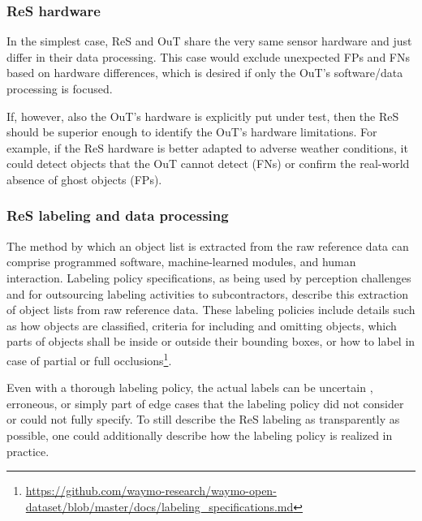 \documentclass[conference]{IEEEtran}
\begin{document}
\subsubsection{ReS hardware}
\label{sec:basic_ref_hw}

In the simplest case, ReS and OuT share the very same sensor hardware and just differ in their data processing. 
This case would exclude unexpected FPs and FNs based on hardware differences, which is desired if only the OuT's software/data processing is focused. 

If, however, also the OuT's hardware is explicitly put under test, then the ReS should be superior enough to identify the OuT's hardware limitations. 
For example, if the ReS hardware is better adapted to adverse weather conditions, it could detect objects that the OuT cannot detect (FNs) or confirm the real-world absence of ghost objects (FPs). 




\subsubsection{ReS labeling and data processing}
\label{sec:basic_ref_labeling}

The method by which an object list is extracted from the raw reference data %
can comprise programmed software, machine-learned modules, and human interaction. 
Labeling policy specifications, as being used by perception challenges and for outsourcing labeling activities to subcontractors, describe this extraction of object lists from raw reference data. 
These labeling policies include details such as how objects are classified, criteria for including and omitting objects, which parts of objects shall be inside or outside their bounding boxes, or how to label in case of partial or full occlusions\footnote{\url{https://github.com/waymo-research/waymo-open-dataset/blob/master/docs/labeling_specifications.md}}.

Even with a thorough labeling policy, the actual labels can be uncertain \cite{wang2020inferring}, erroneous, or simply part of edge cases that the labeling policy did not consider or could not fully specify.
To still describe the ReS labeling as transparently as possible, one could additionally describe how the labeling policy is realized in practice.
\end{document}
